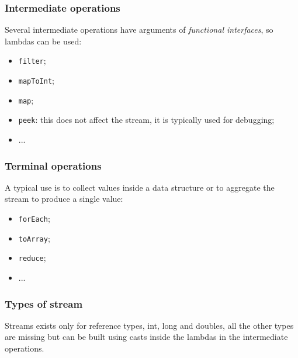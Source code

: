 \subsubsection{Intermediate operations}
Several intermediate operations have arguments of \emph{functional interfaces}, so lambdas can be used:
\begin{itemize}
    \item \verb|filter|;
    \item \verb|mapToInt|;
    \item \verb|map|;
    \item \verb|peek|: this does not affect the stream, it is typically used for debugging;
    \item ...
\end{itemize}

\subsubsection{Terminal operations}
A typical use is to collect values inside a data structure or to aggregate the stream to produce a single value:
\begin{itemize}
    \item \verb|forEach|;
    \item \verb|toArray|;
    \item \verb|reduce|;
    \item ...
\end{itemize}

\subsubsection{Types of stream}
Streams exists only for reference types, int, long and doubles, all the other types are missing but can be built using casts inside the lambdas in the intermediate operations.

